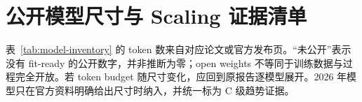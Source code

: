 \documentclass[UTF8,10pt,a4paper,fontset=none]{ctexart}
\begin{document}
\section{公开模型尺寸与 Scaling 证据清单}
\label{app:model-inventory}

表~\ref{tab:model-inventory} 的 token 数来自对应论文或官方发布页。“未公开”表示没有 fit-ready 的公开数字，并非推断为零；open weights 不等同于训练数据与过程完全开放。若 token budget 随尺寸变化，应回到原报告逐模型展开。2026 年模型只在官方资料明确给出尺寸时纳入，并统一标为 C 级趋势证据。

\scriptsize
{}
\setlength{\tabcolsep}{1.7pt}
\setlength{\LTleft}{0pt}
\setlength{\LTright}{0pt}
\noindent\begin{minipage}{\textwidth}
\label{tab:model-inventory}
\end{minipage}
\end{document}
